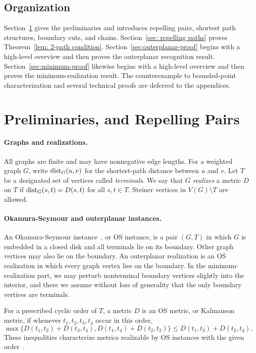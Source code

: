 \documentclass[11pt]{article}
\newcommand{\dist}{\textnormal{dist}}
\begin{document}
\subsection{Organization}

Section~\ref{sec:prelim} gives the preliminaries and introduces repelling pairs, shortest path structures, boundary cuts, and chains. Section~\ref{sec: repelling paths} proves Theorem~\ref{lem: 2-path condition}. Section~\ref{sec:outerplanar-proof} begins with a high-level overview and then proves the outerplanar recognition result. Section~\ref{sec:minimum-proof} likewise begins with a high-level overview and then proves the minimum-realization result. The counterexample to bounded-point characterization and several technical proofs are deferred to the appendices.

\section{Preliminaries, and Repelling Pairs}\label{sec:prelim}

\paragraph{Graphs and realizations.}
All graphs are finite and may have nonnegative edge lengths. For a weighted graph $G$, write $\dist_G(u,v)$ for the shortest-path distance between $u$ and $v$. Let $T$ be a designated set of vertices called \emph{terminals}. We say that $G$ \emph{realizes} a metric $D$ on $T$ if $\dist_G(s,t)=D(s,t)$ for all $s,t\in T$. Steiner vertices in $V(G)\setminus T$ are allowed.

\paragraph{Okamura-Seymour and outerplanar instances.}
An Okamura-Seymour instance~\cite{okamura1981multicommodity}, or OS instance, is a pair $(G,T)$ in which $G$ is embedded in a closed disk and all terminals lie on its boundary. Other graph vertices may also lie on the boundary. An outerplanar realization is an OS realization in which every graph vertex lies on the boundary. In the minimum-realization part, we may perturb nonterminal boundary vertices slightly into the interior, and there we assume without loss of generality that the only boundary vertices are terminals.

For a prescribed cyclic order of $T$, a metric $D$ is an OS metric, or Kalmanson metric, if whenever $t_1,t_2,t_3,t_4$ occur in this order,
\[
\max\{D(t_1,t_2)+D(t_3,t_4),D(t_1,t_4)+D(t_2,t_3)\}
\le D(t_1,t_3)+D(t_2,t_4).
\]
These inequalities characterize metrics realizable by OS instances with the given order~\cite{hurkens1988tidy,ChangO20,schrijver2003combinatorial}.
\end{document}

